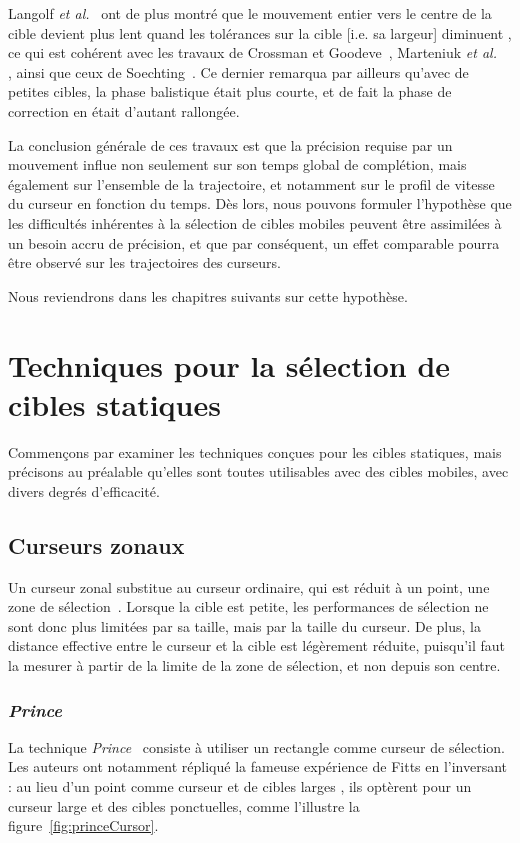 	Langolf \emph{et al.}~\cite{langolf1976investigation} ont de plus montré que \og le mouvement entier vers le centre de la cible devient plus lent quand les tolérances sur la cible [i.e. sa largeur] diminuent \fg{}, ce qui est cohérent avec les travaux de Crossman et Goodeve~\cite{crossman1983feedback}, Marteniuk \emph{et al.}~ \cite{marteniuk1987constraints}, ainsi que ceux de Soechting~\cite{soechting1984effect}. Ce dernier remarqua par ailleurs qu'avec de petites cibles, la phase balistique était plus courte, et de fait la phase de correction en était d'autant rallongée.
	
	La conclusion générale de ces travaux est que la précision requise par un mouvement influe non seulement sur son temps global de complétion, mais également sur l'ensemble de la trajectoire, et notamment sur le profil de vitesse du curseur en fonction du temps. Dès lors, nous pouvons formuler l'hypothèse que les difficultés inhérentes à la sélection de cibles mobiles peuvent être assimilées à un besoin accru de précision, et que par conséquent, un effet comparable pourra être observé sur les trajectoires des curseurs.
	
	Nous reviendrons dans les chapitres suivants sur cette hypothèse.
	
\section{Techniques pour la sélection de cibles statiques}
	Commençons par examiner les techniques conçues pour les cibles statiques, mais précisons au préalable qu'elles sont toutes utilisables avec des cibles mobiles, avec divers degrés d'efficacité.

\subsection{Curseurs zonaux}
	Un curseur zonal substitue au curseur ordinaire, qui est réduit à un point, une zone de sélection~\cite{kabbash1995prince, worden1997making}. Lorsque la cible est petite, les performances de sélection ne sont donc plus limitées par sa taille, mais par la taille du curseur. De plus, la distance effective entre le curseur et la cible est légèrement réduite, puisqu'il faut la mesurer à partir de la limite de la zone de sélection, et non depuis son centre.
	
	\subsubsection{\emph{Prince}}
	La technique \emph{Prince}~\cite{kabbash1995prince} consiste à utiliser un rectangle comme curseur de sélection. Les auteurs ont notamment répliqué la fameuse expérience de Fitts en l'inversant : au lieu d'un point comme curseur et de cibles \og larges \fg{} , ils optèrent pour un curseur large et des cibles ponctuelles, comme l'illustre la figure~\ref{fig:princeCursor}.
	
